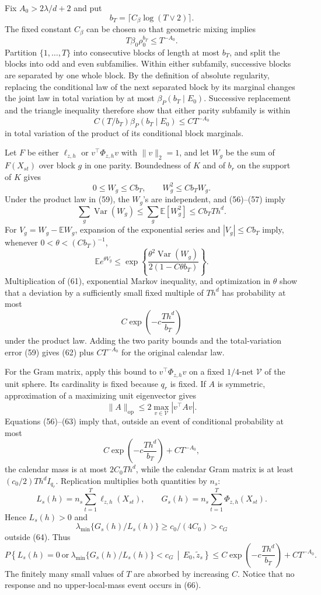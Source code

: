 Fix \(A_0>2\lambda/d+2\) and put
\[
b_T=\lceil C_\beta\log(T\vee2)\rceil.
\]
The fixed constant \(C_\beta\) can be chosen so that geometric mixing implies
\[
T\beta_0\rho_0^{b_T}\leq T^{-A_0}.
\tag{58}
\]
Partition \(\{1,\ldots,T\}\) into consecutive blocks of length at most \(b_T\), and split the blocks into odd and even subfamilies.  Within either subfamily, successive blocks are separated by one whole block.  By the definition of absolute regularity, replacing the conditional law of the next separated block by its marginal changes the joint law in total variation by at most \(\beta_P(b_T\mid E_0)\).  Successive replacement and the triangle inequality therefore show that either parity subfamily is within
\[
C(T/b_T)\beta_P(b_T\mid E_0)\leq CT^{-A_0}
\tag{59}
\]
in total variation of the product of its conditional block marginals.

Let \(F\) be either \(\ell_{z,h}\) or
\(v^\top\Phi_{z,h}v\) with \(\|v\|_2=1\), and let \(W_g\) be the sum of \(F(X_{st})\) over block \(g\) in one parity.  Boundedness of \(K\) and of \(b_r\) on the support of \(K\) gives
\[
0\leq W_g\leq Cb_T,
\qquad
W_g^2\leq Cb_TW_g.
\]
Under the product law in (59), the \(W_g\)'s are independent, and (56)--(57) imply
\[
\sum_g\operatorname{Var}(W_g)
\leq\sum_g\mathbb E[W_g^2]
\leq Cb_TTh^d.
\tag{60}
\]
For \(V_g=W_g-\mathbb EW_g\), expansion of the exponential series and \(|V_g|\leq Cb_T\) imply, whenever \(0<\theta<(Cb_T)^{-1}\),
\[
\mathbb Ee^{\theta V_g}
\leq\exp\!\left\{
\frac{\theta^2\operatorname{Var}(W_g)}{2(1-C\theta b_T)}
\right\}.
\tag{61}
\]
Multiplication of (61), exponential Markov inequality, and optimization in \(\theta\) show that a deviation by a sufficiently small fixed multiple of \(Th^d\) has probability at most
\[
C\exp\!\left(-c\frac{Th^d}{b_T}\right)
\tag{62}
\]
under the product law.  Adding the two parity bounds and the total-variation error (59) gives (62) plus \(CT^{-A_0}\) for the original calendar law.

For the Gram matrix, apply this bound to \(v^\top\Phi_{z,h}v\) on a fixed \(1/4\)-net \(\mathcal V\) of the unit sphere.  Its cardinality is fixed because \(q_r\) is fixed.  If \(A\) is symmetric, approximation of a maximizing unit eigenvector gives
\[
\|A\|_{\mathrm{op}}
\leq2\max_{v\in\mathcal V}|v^\top Av|.
\tag{63}
\]
Equations (56)--(63) imply that, outside an event of conditional probability at most
\[
C\exp\!\left(-c\frac{Th^d}{b_T}\right)+CT^{-A_0},
\tag{64}
\]
the calendar mass is at most \(2C_0Th^d\), while the calendar Gram matrix is at least \((c_0/2)Th^dI_{q_r}\).  Replication multiplies both quantities by \(n_s\):
\[
L_s(h)=n_s\sum_{t=1}^{T}\ell_{z,h}(X_{st}),
\qquad
G_s(h)=n_s\sum_{t=1}^{T}\Phi_{z,h}(X_{st}).
\tag{65}
\]
Hence \(L_s(h)>0\) and
\[
\lambda_{\min}\{G_s(h)/L_s(h)\}
\geq c_0/(4C_0)>c_G
\]
outside (64).  Thus
\[
P\!\left\{L_s(h)=0\ \text{or}\ 
\lambda_{\min}\{G_s(h)/L_s(h)\}<c_G
\,\middle|\,E_0,\widetilde z_s\right\}
\leq C\exp\!\left(-c\frac{Th^d}{b_T}\right)+CT^{-A_0}.
\tag{66}
\]
The finitely many small values of \(T\) are absorbed by increasing \(C\).  Notice that no response and no upper-local-mass event occurs in (66).

